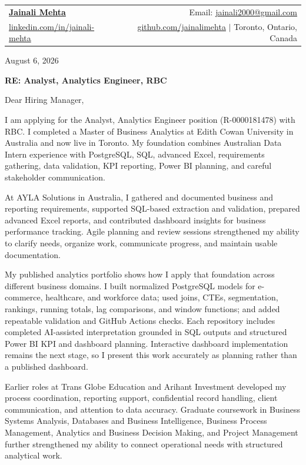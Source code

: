 \documentclass[letterpaper,11pt]{article}
\begin{document}
\begin{tabular*}{\textwidth}{l@{\extracolsep{\fill}}r}
  \textbf{\href{https://www.linkedin.com/in/jainali-mehta}{\Large Jainali Mehta}} & Email: \href{mailto:jainali2000@gmail.com}{jainali2000@gmail.com}\\
  \href{https://www.linkedin.com/in/jainali-mehta}{linkedin.com/in/jainali-mehta} & \href{https://github.com/jainalimehta}{github.com/jainalimehta} $|$ Toronto, Ontario, Canada \\
\end{tabular*}

\hrulefill

\bigbreak
August 6, 2026

\bigbreak
\centerline{\large\textbf{RE: Analyst, Analytics Engineer, RBC}}

\bigbreak
Dear Hiring Manager,

\bigbreak
I am applying for the Analyst, Analytics Engineer position (R-0000181478) with RBC. I completed a Master of Business Analytics at Edith Cowan University in Australia and now live in Toronto. My foundation combines Australian Data Intern experience with PostgreSQL, SQL, advanced Excel, requirements gathering, data validation, KPI reporting, Power BI planning, and careful stakeholder communication.

\bigbreak
At AYLA Solutions in Australia, I gathered and documented business and reporting requirements, supported SQL-based extraction and validation, prepared advanced Excel reports, and contributed dashboard insights for business performance tracking. Agile planning and review sessions strengthened my ability to clarify needs, organize work, communicate progress, and maintain usable documentation.

\bigbreak
My published analytics portfolio shows how I apply that foundation across different business domains. I built normalized PostgreSQL models for e-commerce, healthcare, and workforce data; used joins, CTEs, segmentation, rankings, running totals, lag comparisons, and window functions; and added repeatable validation and GitHub Actions checks. Each repository includes completed AI-assisted interpretation grounded in SQL outputs and structured Power BI KPI and dashboard planning. Interactive dashboard implementation remains the next stage, so I present this work accurately as planning rather than a published dashboard.

\bigbreak
Earlier roles at Trans Globe Education and Arihant Investment developed my process coordination, reporting support, confidential record handling, client communication, and attention to data accuracy. Graduate coursework in Business Systems Analysis, Databases and Business Intelligence, Business Process Management, Analytics and Business Decision Making, and Project Management further strengthened my ability to connect operational needs with structured analytical work.
\end{document}
